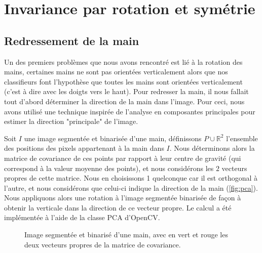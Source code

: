 \section{Invariance par rotation et symétrie}
\subsection{Redressement de la main}
Un des premiers problèmes que nous avons rencontré est lié à la rotation des mains, certaines mains ne sont pas orientées verticalement alors que nos classifieurs font l'hypothèse que toutes les mains sont orientées verticalement (c'est à dire avec les doigts vers le haut). Pour redresser la main, il nous fallait tout d'abord déterminer la direction de la main dans l'image. Pour ceci, nous avons utilisé une technique inspirée de l'analyse en composantes principales pour estimer la direction "principale" de l'image.

Soit $I$ une image segmentée et binarisée d'une main, définissons $P \cup \mathbb{R}^2$ l'ensemble des positions des pixels appartenant à la main dans $I$. Nous déterminons alors la matrice de covariance de ces points par rapport à leur centre de gravité (qui correspond à la valeur moyenne des points), et nous considérons les $2$ vecteurs propres de cette matrice. Nous en choisissons 1 quelconque car il est orthogonal à l'autre, et nous considérons que celui-ci indique la direction de la main (\autoref{fig:pca}). Nous appliquons alors une rotation à l'image segmentée binarisée de façon à obtenir la verticale dans la direction de ce vecteur propre. Le calcul a été implémentée à l'aide de la classe PCA d'OpenCV.

\begin{figure}[htb!]

\caption{Image segmentée et binarisé d'une main, avec en vert et rouge les deux vecteurs propres de la matrice de covariance.}
\label{fig:pca}
\end{figure}